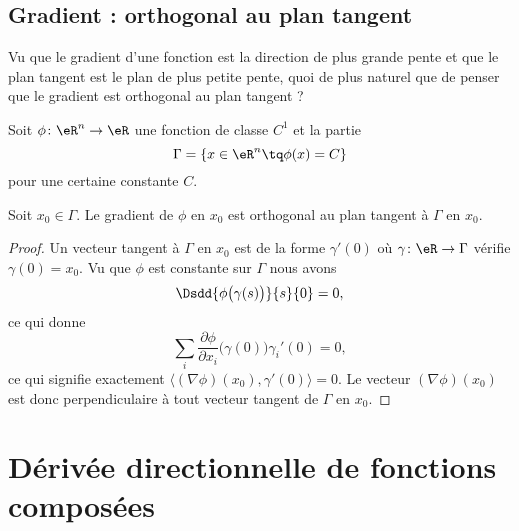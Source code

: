 \subsection{Gradient : orthogonal au plan tangent}

Vu que le gradient d'une fonction est la direction de plus grande pente et que le plan tangent est le plan de plus petite pente, quoi de plus naturel que de penser que le gradient est orthogonal au plan tangent ?

\begin{lemma}
    Soit \( \phi\colon \eR^n\to \eR\) une fonction de classe \( C^1\) et la partie
    \begin{equation}
        \Gamma=\{ x\in \eR^n\tq \phi(x)=C \}
    \end{equation}
    pour une certaine constante \( C\).

    Soit \( x_0\in \Gamma\). Le gradient de \( \phi\) en \( x_0\) est orthogonal au plan tangent à \( \Gamma\) en \( x_0\).
\end{lemma}

\begin{proof}
    Un vecteur tangent à \( \Gamma\) en \( x_0\) est de la forme \( \gamma'(0)\) où \( \gamma\colon \eR \to \Gamma\) vérifie \( \gamma(0)=x_0\). Vu que \( \phi\) est constante sur \( \Gamma\) nous avons
    \begin{equation}
        \Dsdd{ \phi\big( \gamma(s) \big) }{s}{0}=0,
    \end{equation}
    ce qui donne
    \begin{equation}
        \sum_i\frac{ \partial \phi }{ \partial x_i }\big( \gamma(0) \big)\gamma_i'(0)=0,
    \end{equation}
    ce qui signifie exactement \( \langle (\nabla\phi)(x_0), \gamma'(0)\rangle=0\). Le vecteur \( (\nabla\phi)(x_0)\) est donc perpendiculaire à tout vecteur tangent de \( \Gamma\) en \( x_0\).
\end{proof}

\section{Dérivée directionnelle de fonctions composées}		\label{SecDerDirFnComp}

